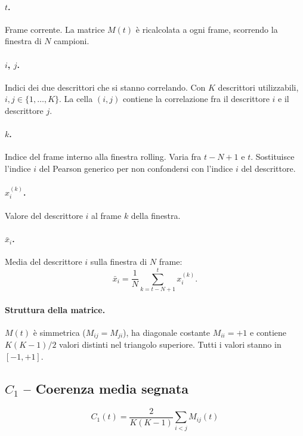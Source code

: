 \documentclass[a4paper,11pt]{article}
\begin{document}
\paragraph{$t$.} Frame corrente. La matrice $M(t)$ è ricalcolata a ogni
frame, scorrendo la finestra di $N$ campioni.

\paragraph{$i$, $j$.} Indici dei due descrittori che si stanno
correlando. Con $K$ descrittori utilizzabili, $i, j \in \{1, \dots, K\}$.
La cella $(i, j)$ contiene la correlazione fra il descrittore $i$ e il
descrittore $j$.

\paragraph{$k$.} Indice del frame interno alla finestra rolling. Varia
fra $t - N + 1$ e $t$. Sostituisce l'indice $i$ del Pearson generico per
non confondersi con l'indice $i$ del descrittore.

\paragraph{$x_i^{(k)}$.} Valore del descrittore $i$ al frame $k$ della
finestra.

\paragraph{$\bar x_i$.} Media del descrittore $i$ sulla finestra di $N$
frame:
\[
\bar x_i = \frac{1}{N}\sum_{k=t-N+1}^{t} x_i^{(k)}.
\]

\paragraph{Struttura della matrice.} $M(t)$ è simmetrica
($M_{ij} = M_{ji}$), ha diagonale costante $M_{ii} = +1$ e contiene
$K(K-1)/2$ valori distinti nel triangolo superiore. Tutti i valori
stanno in $[-1, +1]$.

\subsection{$C_1$ -- Coerenza media segnata}

\[
C_1(t) = \frac{2}{K(K-1)} \sum_{i < j} M_{ij}(t)
\]
\end{document}
